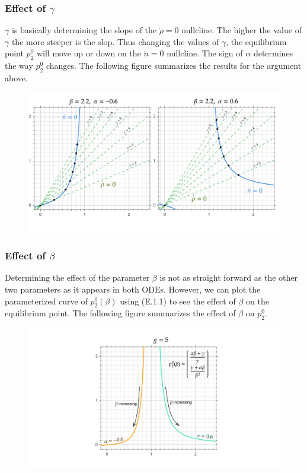 \FloatBarrier

\subsubsection*{Effect of $\gamma$}
$\gamma$ is basically determining the slope of the $\dot{\rho}=0$ nullcline. The higher the value of $\gamma$ the more steeper is the slop. Thus changing the values of $\gamma$, the equilibrium point $p^0_2$ will move up or down on the $\dot{n}=0$ nullcline. The sign of $\alpha$ determines the way $p^0_2$ changes. The following figure summarizes the results for the argument above.

\begin{figure}[h!]
	\centering
	\includegraphics[width=\linewidth]{images/effectOfGamma.png} %
\end{figure}
\FloatBarrier

\subsubsection*{Effect of $\beta$}
Determining the effect of the parameter $\beta$ is not as straight forward as the other two parameters as it appears in both ODEs. However, we can plot the parameterized curve of $p^0_2(\beta)$ using (E.1.1) to see the effect of $\beta$ on the equilibrium point. The following figure summarizes the effect of $\beta$ on $p^0_2$.

\begin{figure}[h!]
	\centering
	\includegraphics[width=\linewidth]{images/EffectOfBeta.png} %
\end{figure}
\FloatBarrier


